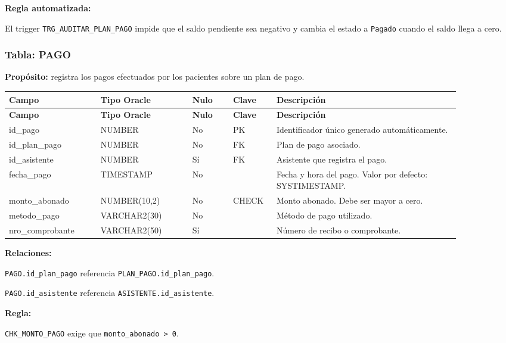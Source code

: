 \textbf{Regla automatizada:}\par
El trigger \texttt{TRG\_AUDITAR\_PLAN\_PAGO} impide que el saldo pendiente sea negativo y cambia el estado a \texttt{Pagado} cuando el saldo llega a cero.\par



\subsubsection{Tabla: PAGO}

\textbf{Propósito:} registra los pagos efectuados por los pacientes sobre un plan de pago.\par

\begin{longtable}{p{0.18\linewidth}p{0.18\linewidth}p{0.08\linewidth}p{0.08\linewidth}p{0.36\linewidth}}
\toprule
\textbf{Campo} & \textbf{Tipo Oracle} & \textbf{Nulo} & \textbf{Clave} & \textbf{Descripción} \\
\midrule
\endfirsthead
\toprule
\textbf{Campo} & \textbf{Tipo Oracle} & \textbf{Nulo} & \textbf{Clave} & \textbf{Descripción} \\
\midrule
\endhead
id\_pago & NUMBER & No & PK & Identificador único generado automáticamente. \\
id\_plan\_pago & NUMBER & No & FK & Plan de pago asociado. \\
id\_asistente & NUMBER & Sí & FK & Asistente que registra el pago. \\
fecha\_pago & TIMESTAMP & No &  & Fecha y hora del pago. Valor por defecto: SYSTIMESTAMP. \\
monto\_abonado & NUMBER(10,2) & No & CHECK & Monto abonado. Debe ser mayor a cero. \\
metodo\_pago & VARCHAR2(30) & No &  & Método de pago utilizado. \\
nro\_comprobante & VARCHAR2(50) & Sí &  & Número de recibo o comprobante. \\
\bottomrule
\end{longtable}

\textbf{Relaciones:}\par
\texttt{PAGO.id\_plan\_pago} referencia \texttt{PLAN\_PAGO.id\_plan\_pago}.\par
\texttt{PAGO.id\_asistente} referencia \texttt{ASISTENTE.id\_asistente}.\par

\textbf{Regla:}\par
\texttt{CHK\_MONTO\_PAGO} exige que \texttt{monto\_abonado \textgreater{} 0}.\par



